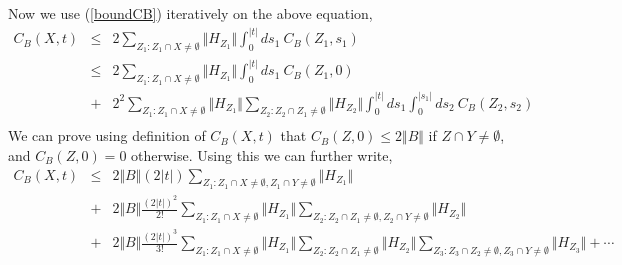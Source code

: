 \documentclass[twoside]{article}
\newcommand{\ret}{\nonumber \\}
\begin{document}
Now we use (\ref{boundCB}) iteratively on the above equation,
\begin{eqnarray}
C_B(X,t)&\le&2\sum_{Z_1:Z_1\cap X\ne\emptyset}\Vert H_{Z_1}\Vert
\int_0^{|t|}ds_1\> C_B(Z_1,s_1)\ret
&\le&2\sum_{Z_1:Z_1\cap X\ne\emptyset}\Vert H_{Z_1}\Vert
\int_0^{|t|}ds_1\> C_B(Z_1,0)\ret
&+&2^2\sum_{Z_1:Z_1\cap X\ne\emptyset}\Vert H_{Z_1}\Vert
\sum_{Z_2:Z_2\cap Z_1\ne\emptyset}\Vert H_{Z_2}\Vert
\int_0^{|t|}ds_1\int_0^{|s_1|}ds_2\> C_B(Z_2,s_2)\ret
\end{eqnarray}
We can prove using definition of $C_B(X,t)$ that $C_B(Z,0)\le2\Vert B \Vert$ if $Z\cap Y\ne\emptyset$, and $C_B(Z,0) = 0$ otherwise. Using this we can further write,
\begin{eqnarray}
C_B(X,t)
&\le&2\Vert B\Vert(2|t|)\sum_{Z_1:Z_1\cap X\ne\emptyset,Z_1\cap Y\ne\emptyset}
\Vert H_{Z_1}\Vert\ret
&+&2\Vert B\Vert\frac{(2|t|)^2}{2!}
\sum_{Z_1:Z_1\cap X\ne\emptyset}\Vert H_{Z_1}\Vert
\sum_{Z_2:Z_2\cap Z_1\ne\emptyset,Z_2\cap Y\ne\emptyset}\Vert H_{Z_2}\Vert\ret
&+&2\Vert B\Vert\frac{(2|t|)^3}{3!}
\sum_{Z_1:Z_1\cap X\ne\emptyset}\Vert H_{Z_1}\Vert
\sum_{Z_2:Z_2\cap Z_1\ne\emptyset}\Vert H_{Z_2}\Vert
\sum_{Z_3:Z_3\cap Z_2\ne\emptyset,Z_3\cap Y\ne\emptyset}\Vert H_{Z_3}\Vert+\cdots
\ret
\label{CBseries}
\end{eqnarray}
\end{document}
